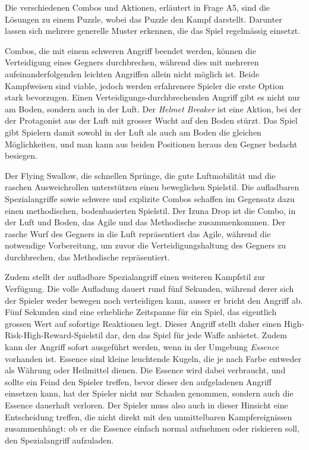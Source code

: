 \documentclass[../Main.tex]{subfiles}
\begin{document}
Die verschiedenen Combos und Aktionen, erläutert in Frage A5, sind die Lösungen zu einem Puzzle, wobei das Puzzle den Kampf darstellt. Darunter lassen sich mehrere generelle Muster erkennen, die das Spiel regelmässig einsetzt.

Combos, die mit einem schweren Angriff beendet werden, können die Verteidigung eines Gegners durchbrechen, während dies mit mehreren aufeinanderfolgenden leichten Angriffen allein nicht möglich ist. Beide Kampfweisen sind viable, jedoch werden erfahrenere Spieler die erste Option stark bevorzugen. Einen Verteidigungs-durchbrechenden Angriff gibt es nicht nur am Boden, sondern auch in der Luft. Der \textit{Helmet Breaker} ist eine Aktion, bei der der Protagonist aus der Luft mit grosser Wucht auf den Boden stürzt. Das Spiel gibt Spielern damit sowohl in der Luft als auch am Boden die gleichen Möglichkeiten, und man kann aus beiden Positionen heraus den Gegner bedacht besiegen.

Der Flying Swallow, die schnellen Sprünge, die gute Luftmobilität und die raschen Ausweichrollen unterstützen einen beweglichen Spielstil. Die aufladbaren Spezialangriffe sowie schwere und explizite Combos schaffen im Gegensatz dazu einen methodischen, bodenbasierten Spielstil. Der Izuna Drop ist die Combo, in der Luft und Boden, das Agile und das Methodische zusammenkommen. Der rasche Wurf des Gegners in die Luft repräsentiert das Agile, während die notwendige Vorbereitung, um zuvor die Verteidigungshaltung des Gegners zu durchbrechen, das Methodische repräsentiert.

Zudem stellt der aufladbare Spezialangriff einen weiteren Kampfstil zur Verfügung. Die volle Aufladung dauert rund fünf Sekunden, während derer sich der Spieler weder bewegen noch verteidigen kann, ausser er bricht den Angriff ab. Fünf Sekunden sind eine erhebliche Zeitspanne für ein Spiel, das eigentlich grossen Wert auf sofortige Reaktionen legt. Dieser Angriff stellt daher einen High-Risk-High-Reward-Spielstil dar, den das Spiel für jede Waffe anbietet. Zudem kann der Angriff sofort ausgeführt werden, wenn in der Umgebung \textit{Essence} vorhanden ist. Essence sind kleine leuchtende Kugeln, die je nach Farbe entweder als Währung oder Heilmittel dienen. Die Essence wird dabei verbraucht, und sollte ein Feind den Spieler treffen, bevor dieser den aufgeladenen Angriff einsetzen kann, hat der Spieler nicht nur Schaden genommen, sondern auch die Essence dauerhaft verloren. Der Spieler muss also auch in dieser Hinsicht eine Entscheidung treffen, die nicht direkt mit den unmittelbaren Kampfereignissen zusammenhängt: ob er die Essence einfach normal aufnehmen oder riskieren soll, den Spezialangriff aufzuladen.
\end{document}
